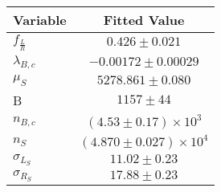 \begin{tabular}[t]{lc}
\hline
Variable &Fitted Value\\
\hline\hline
$f_{\frac{L}{R}}$&$0.426\pm0.021$\\
\hline
$\lambda_{B,c}$&$-0.00172\pm0.00029$\\
\hline
$\mu_S$&$5278.861\pm0.080$\\
\hline
B&$1157\pm44$\\
\hline
$n_{B,c}$&$(4.53\pm0.17)\times 10^3$\\
\hline
$n_S$&$(4.870\pm0.027)\times 10^4$\\
\hline
$\sigma_{L_S}$&$11.02\pm0.23$\\
\hline
$\sigma_{R_S}$&$17.88\pm0.23$\\
\hline
\end{tabular}